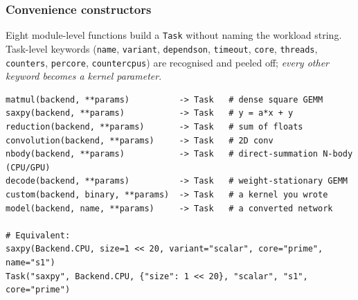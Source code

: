 \documentclass[11pt,a4paper]{article}
\newcommand{\code}[1]{\texttt{\let\_\breakableunderscore #1}}
\newcommand{\breakableunderscore}{\textunderscore\allowbreak}
\begin{document}
\subsubsection*{Convenience constructors}

Eight module-level functions build a \code{Task} without naming the workload
string. Task-level keywords (\code{name}, \code{variant}, \code{depends\_on},
\code{timeout}, \code{core}, \code{threads}, \code{counters}, \code{per\_core},
\code{counter\_cpus}) are recognised and peeled off; \emph{every other keyword
becomes a kernel parameter}.

\begin{lstlisting}
matmul(backend, **params)          -> Task   # dense square GEMM
saxpy(backend, **params)           -> Task   # y = a*x + y
reduction(backend, **params)       -> Task   # sum of floats
convolution(backend, **params)     -> Task   # 2D conv
nbody(backend, **params)           -> Task   # direct-summation N-body (CPU/GPU)
decode(backend, **params)          -> Task   # weight-stationary GEMM
custom(backend, binary, **params)  -> Task   # a kernel you wrote
model(backend, name, **params)     -> Task   # a converted network

# Equivalent:
saxpy(Backend.CPU, size=1 << 20, variant="scalar", core="prime", name="s1")
Task("saxpy", Backend.CPU, {"size": 1 << 20}, "scalar", "s1", core="prime")
\end{lstlisting}
\end{document}
